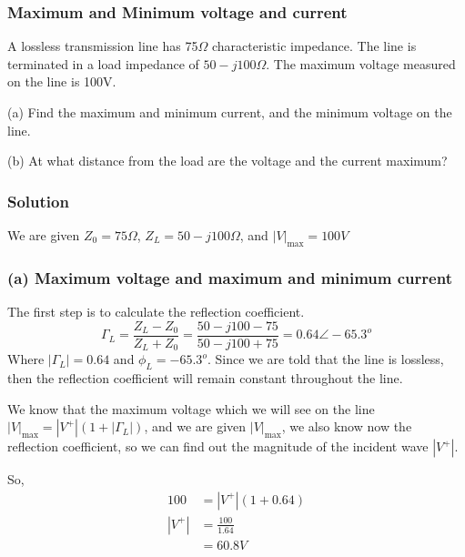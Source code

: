 \begin{exmp}
\subsubsection*{Maximum and Minimum voltage and current}
A lossless transmission line has 75$\Omega$ characteristic impedance. The line is terminated in a load impedance of $50-j100\Omega$. The maximum voltage measured on the line is 100V.

(a) Find the maximum and minimum current, and the minimum voltage on the line.

(b) At what distance from the load are the voltage and the current maximum?

\subsubsection*{Solution}
We are given
$Z_{0}=75\Omega$,
$Z_{L}=50-j100\Omega$, and 
$|V|_\max=100V$

\subsubsection*{(a) Maximum voltage and maximum and minimum current}
The first step is to calculate the reflection coefficient.
\begin{dmath*}
\Gamma_{L}=\frac{Z_{L}-Z_{0}}{Z_{L}+Z_{0}}
=\frac{50-j100-75}{50-j100+75}
=0.64\angle-65.3^o 
\end{dmath*}
Where $|\Gamma_{L}|=0.64$ and $\phi_{L}=-65.3^o$. Since we are told that the line is lossless, then the reflection coefficient will remain constant throughout the line.

We know that the maximum voltage which we will see on the line $|V|_\max=|V^{+}|(1+|\Gamma_{L}|)$, and we are given $|V|_\max$, we also know now the reflection coefficient, so we can find out the magnitude of the incident wave $|V^+|$.

So,
\begin{align*}
100&=|V^{+}|(1+0.64)\\
|V^{+}|&=\frac{100}{1.64}\\
&=60.8V
\end{align*}


\end{exmp}
